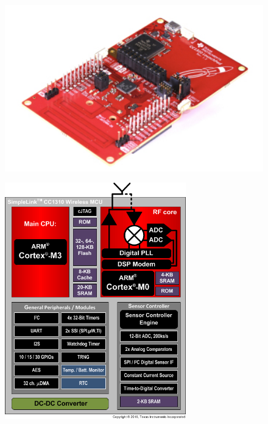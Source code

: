 \vspace{-1.5em}
\begin{figure}[h!]
	\centering
	\begin{minipage}{.5\textwidth}
		\centering
		\vspace{2.5em}
		\includegraphics[width=1\textwidth,keepaspectratio]{figures/cc1310_board}
		\vspace{2em}
		\label{fig:test1}
	\end{minipage}%
	\begin{minipage}{.5\textwidth}
		\centering
		\includegraphics[width=0.70\textwidth,keepaspectratio]{figures/cc1310}
		\label{fig:test2}
	\end{minipage}
\end{figure}

